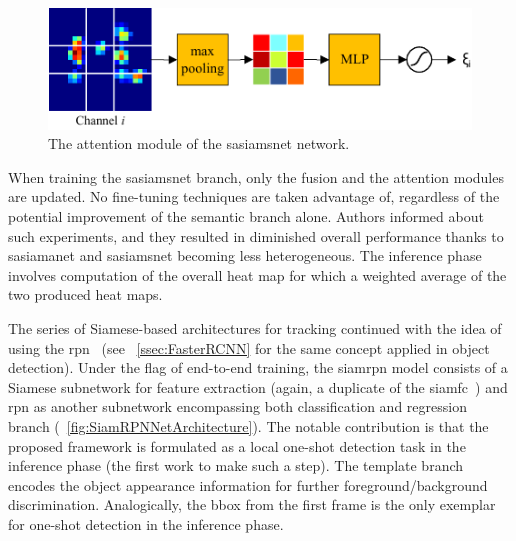 \begin{figure}[t]
    \centerline{\includegraphics[width=0.6\linewidth]{figures/theoretical_foundations/twofold_siamese_net_attention_module.pdf}}
    \caption[\gls{sasiamsnet} attention module]{The attention module of the \gls{sasiamsnet} network. }
    \label{fig:TwofoldSiameseNetAttentionModule}
\end{figure}

When training the \gls{sasiamsnet} branch, only the fusion and the attention modules are updated. No fine-tuning techniques are taken advantage of, regardless of the potential improvement of the semantic branch alone. Authors informed about such experiments, and they resulted in diminished overall performance thanks to \gls{sasiamanet} and \gls{sasiamsnet} becoming less heterogeneous. The inference phase involves computation of the overall heat map for which a weighted average of the two produced heat maps.

The series of Siamese-based architectures for tracking continued with the idea of using the \gls{rpn}~\cite{li2018siamrpn} (see \sectiontext{}~\ref{ssec:FasterRCNN} for the same concept applied in object detection). Under the flag of end-to-end training, the \gls{siamrpn} model consists of a Siamese subnetwork for feature extraction (again, a duplicate of the \gls{siamfc}~\cite{bertinetto2016siamfc}) and \gls{rpn} as another subnetwork encompassing both classification and regression branch (\figtext{}~\ref{fig:SiamRPNNetArchitecture}). The notable contribution is that the proposed framework is formulated as a local one-shot detection task in the inference phase (the first work to make such a step). The template branch encodes the object appearance information for further foreground/background discrimination. Analogically, the \gls{bbox} from the first frame is the only exemplar for one-shot detection in the inference phase.

